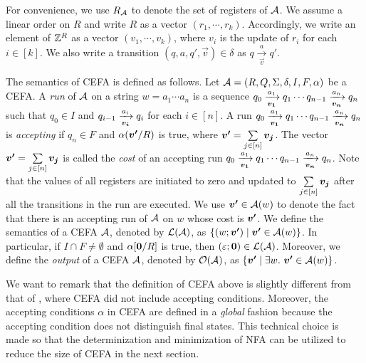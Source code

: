 For convenience, we use $R_{\mathcal{A}}$ to denote the set of registers of $\mathcal{A}$. We assume a linear order on $R$ and write $R$ as a vector $(r_1, \cdots, r_k)$. Accordingly, we write an element of $\mathbb{Z}^R$ as a vector $(v_1, \cdots, v_k)$, where $v_i$ is the update of $r_i$ for each $i \in [k]$. We also write a transition $(q, a, q', \vec{v}) \in \delta$ as $q \xrightarrow[\vec{v}]{a} q'$.

The semantics of CEFA is defined as follows. Let $\mathcal{A} = (R, Q, \Sigma, \delta, I, F, \alpha)$ be a CEFA. 
A \emph{run} of $\mathcal{A}$ on a string $w = a_1 \cdots a_n$ is a sequence $q_0 \xrightarrow[\myvec{v_1}]{a_1} q_1 \cdots q_{n-1}\xrightarrow[\myvec{v_n}]{a_n} q_n$ such that $q_0 \in I$ and $q_{i-1} \xrightarrow[\myvec{v_i}]{a_i} q_i$ for each $i \in [n]$. A run $q_0 \xrightarrow[\myvec{v_1}]{a_1} q_1 \cdots q_{n-1}\xrightarrow[\myvec{v_n}]{a_n} q_n$ is \emph{accepting} if $q_n \in F$ and $\alpha(\myvec{v'}/R)$ is true, where $\myvec{v'} = \sum \limits_{j \in [n]} \myvec{v_j}$. The vector $\myvec{v'}= \sum \limits_{j \in [n]} \myvec{v_j}$ is called the \emph{cost} of an accepting run $q_0 \xrightarrow[\myvec{v_1}]{a_1} q_1 \cdots q_{n-1}\xrightarrow[\myvec{v_n}]{a_n} q_n$. Note that the values of all registers are initiated to zero and updated to $\sum \limits_{j \in [n]} \myvec{v_j}$ after all the transitions in the run are executed. We use $\myvec{v'} \in \aut(w)$ to denote the fact that there is an accepting run of $\mathcal{A}$ on $w$ whose cost is $\myvec{v'}$.  
We define the semantics of a CEFA $\mathcal{A}$, denoted by $\mathcal{L}(\mathcal{A})$, as $\{(w; \myvec{v'}) \mid  \myvec{v'} \in \aut(w)\}$.  In particular, if $I \cap F \neq \emptyset$ and $\alpha[\myvec{0}/R]$ is true, then $(\varepsilon; \myvec{0}) \in \Lang(\aut)$. Moreover, we define the \emph{output} of a CEFA $\mathcal{A}$, denoted by $\mathcal{O}(\mathcal{A})$, as $\{\myvec{v'} \mid  \exists w.\ \myvec{v'} \in \aut(w)\}$.

We want to remark that the definition of CEFA above is slightly different from that of \cite{atva2020}, where CEFA did not include accepting conditions.
Moreover, the accepting conditions $\alpha$ in CEFA are defined in a \emph{global} fashion because the accepting condition does not distinguish final states. This technical choice is made so that the determinization and minimization of NFA can be utilized to reduce the size of CEFA in the next section. 


